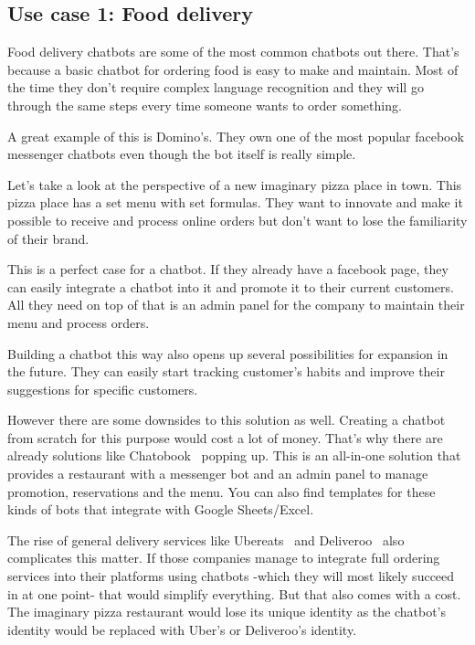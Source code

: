 \subsection{Use case 1: Food delivery}

Food delivery chatbots are some of the most common chatbots out there. That's because a basic chatbot for ordering food is easy to make and maintain. Most of the time they don't require complex language recognition and they will go through the same steps every time someone wants to order something.

A great example of this is Domino's\cite{dominos}. They own one of the most popular facebook messenger chatbots even though the bot itself is really simple.

Let's take a look at the perspective of a new imaginary pizza place in town. This pizza place has a set menu with set formulas. They want to innovate and make it possible to receive and process online orders but don't want to lose the familiarity of their brand.

This is a perfect case for a chatbot. If they already have a facebook page, they can easily integrate a chatbot into it and promote it to their current customers. All they need on top of that is an admin panel for the company to maintain their menu and process orders.

Building a chatbot this way also opens up several possibilities for expansion in the future. They can easily start tracking customer's habits and improve their suggestions for specific customers.

However there are some downsides to this solution as well. Creating a chatbot from scratch for this purpose would cost a lot of money. That's why there are already solutions like Chatobook~\cite{chatobook} popping up. This is an all-in-one solution that provides a restaurant with a messenger bot and an admin panel to manage promotion, reservations and the menu. You can also find templates for these kinds of bots that integrate with Google Sheets/Excel.~\cite{chatbot-templates-pizza}

The rise of general delivery services like Ubereats~\cite{ubereats} and Deliveroo~\cite{deliveroo} also complicates this matter. If those companies manage to integrate full ordering services into their platforms using chatbots -which they will most likely succeed in at one point- that would simplify everything. But that also comes with a cost. The imaginary pizza restaurant would lose its unique identity as the chatbot's identity would be replaced with Uber's or Deliveroo's identity.

